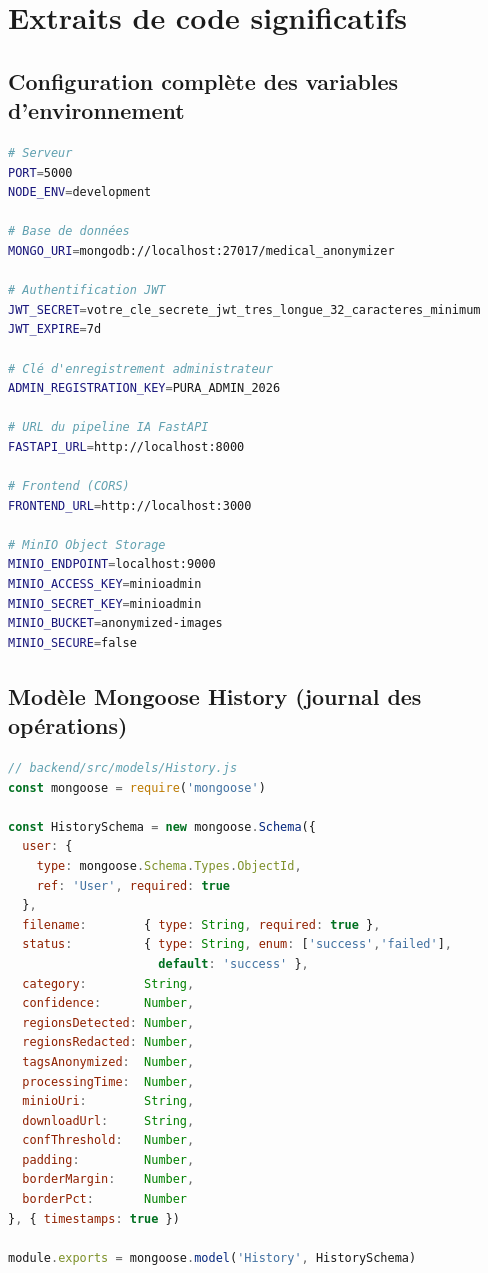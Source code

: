 \chapter{Extraits de code significatifs}
\label{annexe:code}

\section{Configuration complète des variables d'environnement}

\begin{lstlisting}[language=bash, caption={backend/.env -- Variables d'environnement complètes}, label={lst:env_complet}]
# Serveur
PORT=5000
NODE_ENV=development

# Base de données
MONGO_URI=mongodb://localhost:27017/medical_anonymizer

# Authentification JWT
JWT_SECRET=votre_cle_secrete_jwt_tres_longue_32_caracteres_minimum
JWT_EXPIRE=7d

# Clé d'enregistrement administrateur
ADMIN_REGISTRATION_KEY=PURA_ADMIN_2026

# URL du pipeline IA FastAPI
FASTAPI_URL=http://localhost:8000

# Frontend (CORS)
FRONTEND_URL=http://localhost:3000

# MinIO Object Storage
MINIO_ENDPOINT=localhost:9000
MINIO_ACCESS_KEY=minioadmin
MINIO_SECRET_KEY=minioadmin
MINIO_BUCKET=anonymized-images
MINIO_SECURE=false
\end{lstlisting}

\section{Modèle Mongoose History (journal des opérations)}

\begin{lstlisting}[language=JavaScript, caption={Modèle Mongoose History}, label={lst:history_model}]
// backend/src/models/History.js
const mongoose = require('mongoose')

const HistorySchema = new mongoose.Schema({
  user: {
    type: mongoose.Schema.Types.ObjectId,
    ref: 'User', required: true
  },
  filename:        { type: String, required: true },
  status:          { type: String, enum: ['success','failed'],
                     default: 'success' },
  category:        String,
  confidence:      Number,
  regionsDetected: Number,
  regionsRedacted: Number,
  tagsAnonymized:  Number,
  processingTime:  Number,
  minioUri:        String,
  downloadUrl:     String,
  confThreshold:   Number,
  padding:         Number,
  borderMargin:    Number,
  borderPct:       Number
}, { timestamps: true })

module.exports = mongoose.model('History', HistorySchema)
\end{lstlisting}

